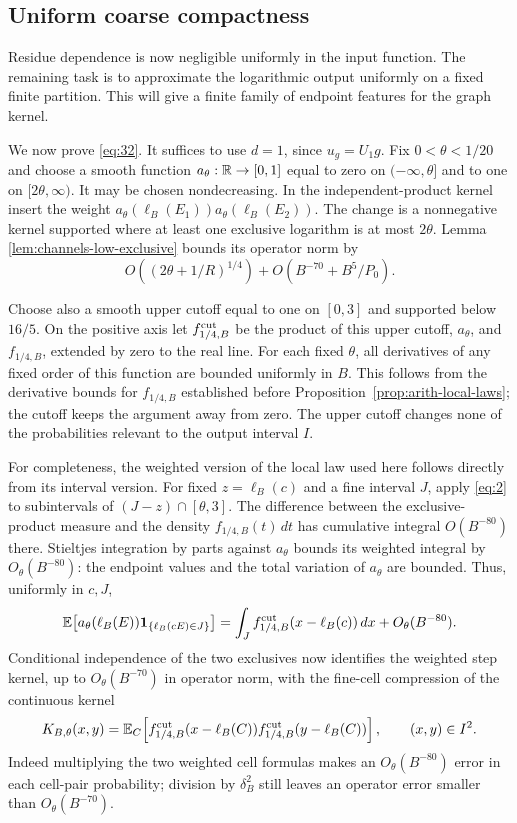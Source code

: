 \subsection{Uniform coarse compactness}

Residue dependence is now negligible uniformly in the input function.
The remaining task is to approximate the logarithmic output uniformly on
a fixed finite partition. This will give a finite family of endpoint
features for the graph kernel.

We now prove \eqref{eq:32}.  It suffices to use \(d=1\), since \(u_g=U_1g\).
Fix \(0<\theta<1/20\) and choose a smooth function \(a_\theta:\mathbb R\to[0,1]\)
equal to zero on \((-\infty,\theta]\) and to one on
\([2\theta,\infty)\).  It may be chosen nondecreasing.
In the independent-product kernel insert the weight
\(a_\theta(\ell_B(E_1))a_\theta(\ell_B(E_2))\).
The change is a nonnegative kernel supported where at least one
exclusive logarithm is at most \(2\theta\).  Lemma
\ref{lem:channels-low-exclusive} bounds its operator norm by
\[
 O((2\theta+1/R)^{1/4})+O(B^{-70}+B^5/P_0).
\]

Choose also a smooth upper cutoff equal to one on \([0,3]\) and supported
below \(16/5\).  On the positive axis let \(f_{1/4,B}^{\rm cut}\) be the
product of this upper cutoff, \(a_\theta\), and \(f_{1/4,B}\), extended
by zero to the real line.  For each fixed \(\theta\), all derivatives
of any fixed order of this function are bounded uniformly in \(B\).
This follows from the derivative bounds for $f_{1/4,B}$ established
before Proposition~\ref{prop:arith-local-laws};
the cutoff keeps the argument away from zero.
The upper cutoff changes none of the probabilities relevant to the
output interval \(I\).

For completeness, the weighted version of the local law used here
follows directly from its interval version.  For fixed \(z=\ell_B(c)\)
and a fine interval \(J\), apply \eqref{eq:2} to subintervals of
\((J-z)\cap[\theta,3]\).  The difference between the exclusive-product
measure and the density \(f_{1/4,B}(t)\,dt\) has cumulative integral
\(O(B^{-80})\) there.  Stieltjes integration by parts against
\(a_\theta\) bounds its weighted integral by \(O_\theta(B^{-80})\):
the endpoint values and the total variation of \(a_\theta\) are bounded.
Thus, uniformly in \(c,J\),
\[
 \mathbb E\!\left[
   a_\theta(\ell_B(E))\mathbf 1_{\{\ell_B(cE)\in J\}}\right]
 =\int_J f_{1/4,B}^{\rm cut}(x-\ell_B(c))\,dx
       +O_\theta(B^{-80}).
\]
Conditional independence of the two exclusives now identifies the
weighted step kernel, up to \(O_\theta(B^{-70})\) in operator norm,
with the fine-cell compression of the continuous kernel
\begin{equation}\label{eq:channels-smooth-kernel}
 K_{B,\theta}(x,y)=
 \mathbb E_C\!\left[
  f_{1/4,B}^{\rm cut}(x-\ell_B(C))
  f_{1/4,B}^{\rm cut}(y-\ell_B(C))\right],
 \qquad (x,y)\in I^2.
\end{equation}
Indeed multiplying the two weighted cell formulas makes an
\(O_\theta(B^{-80})\) error in each cell-pair probability; division by
\(\delta_B^2\) still leaves an operator error smaller than
\(O_\theta(B^{-70})\).

